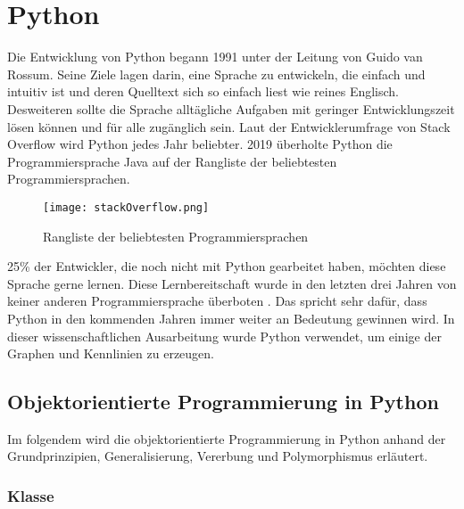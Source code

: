 
\chapter{Python}

Die Entwicklung von Python begann 1991 unter der Leitung von Guido van Rossum. Seine Ziele lagen darin, eine Sprache zu entwickeln, die einfach und intuitiv ist und deren Quelltext sich so einfach liest wie reines Englisch. Desweiteren sollte die Sprache alltägliche Aufgaben mit geringer Entwicklungszeit lösen können und für alle zugänglich sein.
Laut der Entwicklerumfrage von Stack Overflow wird Python jedes Jahr beliebter. 2019 überholte Python die Programmiersprache Java auf der Rangliste der beliebtesten Programmiersprachen. 

\begin{figure}[!htb]
\texttt{[image: stackOverflow.png]}%
\caption{Rangliste der beliebtesten Programmiersprachen }
\label{img:stackoverflowBild}
\end{figure}

25\% der Entwickler, die noch nicht mit Python gearbeitet haben, möchten diese Sprache gerne lernen. Diese Lernbereitschaft wurde in den letzten drei Jahren von keiner anderen Programmiersprache überboten \cite{stackoverflow}. Das spricht sehr dafür, dass Python in den kommenden Jahren immer weiter an Bedeutung gewinnen wird. In dieser wissenschaftlichen Ausarbeitung wurde Python verwendet, um einige der Graphen und Kennlinien zu erzeugen. 

\section{Objektorientierte Programmierung in Python}

Im folgendem wird die objektorientierte Programmierung in Python anhand der Grundprinzipien, Generalisierung, Vererbung und Polymorphismus erläutert. 

\subsection{Klasse} \label{subsec:Klasse}

